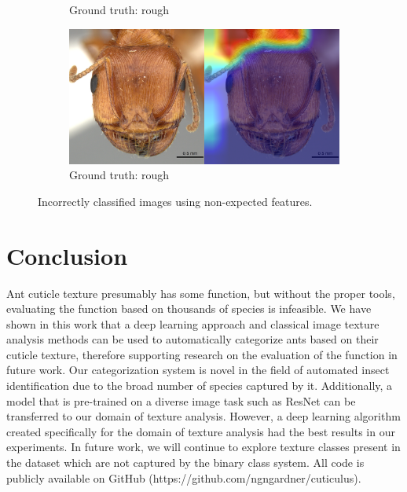 \documentclass{aci}
\numberwithin{equation}{section}
\begin{document}
\begin{figure}
\begin{subfigure}{\subwidth}
        \caption{Ground truth: rough}
        \label{fig:incorrect_nonideal_61}
    \end{subfigure}
    \begin{subfigure}{\subwidth}
        \includegraphics[width=1\linewidth]{thesis_assets/gradcam/incorrect_nonideal/204.png}
        \caption{Ground truth: rough}
        \label{fig:incorrect_nonideal_204}
    \end{subfigure}
    \caption{Incorrectly classified images using non-expected features.}
    \label{fig:incorrect_nonideal}
\end{figure}

\FloatBarrier
\section{Conclusion}
Ant cuticle texture presumably has some function, but without the proper tools,
evaluating the function based on thousands of species is infeasible. We have
shown in this work that a deep learning approach and classical image texture
analysis methods can be used to automatically categorize ants based on their
cuticle texture, therefore supporting research on the evaluation of the function
in future work. Our categorization system is novel in the field of automated
insect identification due to the broad number of species captured by it.
Additionally, a model that is pre-trained on a diverse image task such as ResNet
can be transferred to our domain of texture analysis. However, a deep learning
algorithm created specifically for the domain of texture analysis had the best
results in our experiments. In future work, we will continue to explore texture
classes present in the dataset which are not captured by the binary class
system. All code is publicly available on GitHub
(https://github.com/ngngardner/cuticulus).



\end{document}
